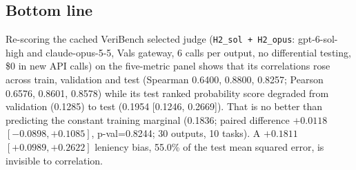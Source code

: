 
\subsection*{Bottom line}
Re-scoring the cached VeriBench selected judge (\texttt{H2\_sol + H2\_opus}: gpt-6-sol-high and claude-opus-5-5, Vals gateway,
6 calls per output, no differential testing, \$0 in new API calls) on the five-metric panel shows that its correlations
rose across train, validation and test (Spearman 0.6400, 0.8800, 0.8257; Pearson 0.6576, 0.8601, 0.8578) while its test
ranked probability score degraded from validation (0.1285) to test (0.1954 [0.1246, 0.2669]). That is no better than
predicting the constant training marginal (0.1836; paired difference $+0.0118$ $[-0.0898, +0.1085]$, p-val=0.8244; 30 outputs,
10 tasks). A $+0.1811$ $[+0.0989, +0.2622]$ leniency bias, 55.0\% of the test mean squared error, is invisible to correlation.

